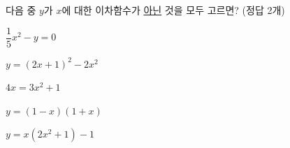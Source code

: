 다음 중 $y$가 $x$에 대한 이차함수가 \underline{아닌} 것을 모두 고르면? (정답 2개)
\begin{choicesii}{\rule[-3ex]{0pt}{8ex}$\dfrac{1}{5}x^2-y=0$}{\rule[-3ex]{0pt}{8ex}$y=(2x+1)^2-2x^2$}{\rule[-3ex]{0pt}{8ex}$4x=3x^2+1$}{\rule[-3ex]{0pt}{8ex}$y=(1-x)(1+x)$}{\rule[-3ex]{0pt}{8ex}$y=x(2x^2+1)-1$}\end{choicesii}
